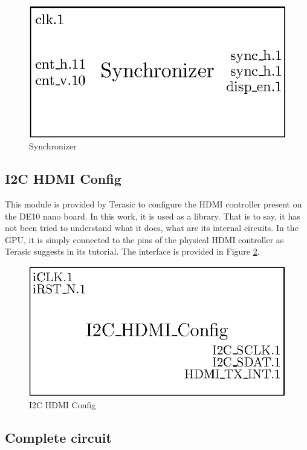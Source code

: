 \begin{figure}[H]
    \centering
    \includegraphics[scale=1.0]{Chapter4-GPU_CLKU/res/synchronizer}
    \caption{Synchronizer}
    \label{fig:gpu/synchronizer}
\end{figure}

\subsection{I2C HDMI Config}

This module is provided by Terasic to configure the HDMI controller present on the DE10 nano board. 
In this work, it is used as a library. That is to say, it has not been tried to understand what it 
does, what are its internal circuits. In the GPU, it is simply connected to the pins of the physical
HDMI controller as Terasic suggests in its tutorial. The interface is provided in 
Figure \ref{fig:gpu/i2c}.

\begin{figure}[H]
    \centering
    \includegraphics[scale=0.8]{Chapter4-GPU_CLKU/res/i2c}
    \caption{I2C HDMI Config}
    \label{fig:gpu/i2c}
\end{figure}

\subsection{Complete circuit}

